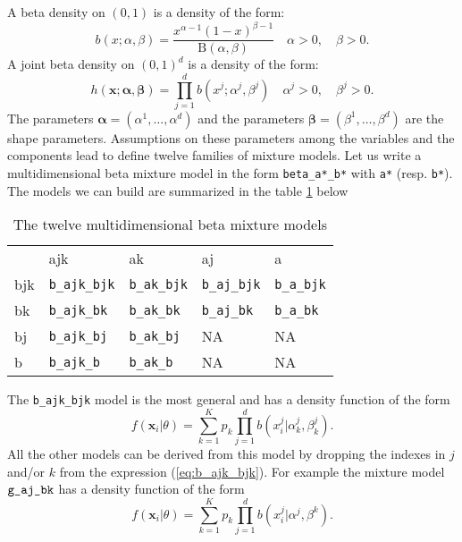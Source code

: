 \documentclass[a4paper,10pt]{article}
\newcommand{\bx}{\mathbf{x}}
\newcommand{\balpha}{\boldsymbol{\alpha}}
\newcommand{\bbeta}{\boldsymbol{\beta}}
\begin{document}
A beta density on $(0,1)$ is a density of the form:
\begin{equation}\label{law::beta-density}
b(x;\alpha,\beta) = \frac{x^{\alpha-1}(1-x)^{\beta-1}} {\mathrm{B}(\alpha,\beta)} \quad \alpha>0, \quad \beta>0.
\end{equation}
A joint beta density on $(0,1)^d$ is a density of the form:
\begin{equation}\label{law::joint-beta-density}
h(\bx;\balpha,\bbeta) = \prod_{j=1}^d b(x^j;\alpha^j,\beta^j) \quad \alpha^j>0, \quad \beta^j>0.
\end{equation}
The parameters $\balpha=(\alpha^1,\ldots,\alpha^d)$ and the parameters $\bbeta=(\beta^1,\ldots,\beta^d)$ are the
shape parameters. Assumptions on these parameters among the variables and the components
lead to define twelve families of mixture models. Let us write a multidimensional beta mixture model in the form
\verb+beta_a*_b*+ with \verb+a*+ (resp. \verb+b*+).
The models we can build are summarized in the table \ref{tab:betamodels} below
\begin{table}[htb]
\begin{center}
\begin{tabular}{lllll}
    &  ajk                    &  ak                     &  aj           &  a \\
bjk & \verb+b_ajk_bjk+  & \verb+b_ak_bjk+ & \verb+b_aj_bjk+ & \verb+b_a_bjk+\\
bk  & \verb+b_ajk_bk+   & \verb+b_ak_bk+  & \verb+b_aj_bk+  & \verb+b_a_bk+  \\
bj  & \verb+b_ajk_bj+   & \verb+b_ak_bj+  & NA  & NA  \\
b   & \verb+b_ajk_b+    & \verb+b_ak_b+   & NA  & NA \\
\end{tabular}
\end{center}
\caption{The twelve multidimensional beta mixture models}
\label{tab:betamodels}
\end{table}

The \verb+b_ajk_bjk+ model is the most general and has a density function of the form
\begin{equation}\label{eq:b_ajk_bjk}
  f({\bx}_i|\theta) = \sum_{k=1}^K p_k \prod_{j=1}^d b(x^j_{i}| \alpha^j_{k},\beta^j_{k}).
\end{equation}
All the other models can be derived from this model by dropping the indexes in $j$ and/or $k$
from the expression (\ref{eq:b_ajk_bjk}). For example the mixture model $\verb+g_aj_bk+$ has a density
function of the form
\begin{equation}\label{eq:b_aj_bk}
  f({\bx}_i|\theta) = \sum_{k=1}^K p_k \prod_{j=1}^d b(x^j_{i}| \alpha^j,\beta^{k}).
\end{equation}
\end{document}
